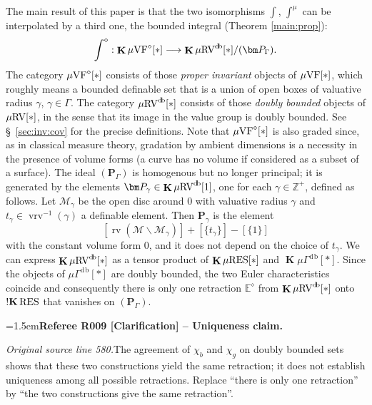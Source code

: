 \documentclass[12pt]{amsart}
\newcommand{\RefereeRemark}[4]{%
  \par\medskip\begingroup\normalfont\small\color{RefereePurple}%
  \emergencystretch=1.5em\noindent\textbf{Referee R#1 [#2] -- #3.}\par\nobreak\noindent #4\par
  \endgroup\medskip
}
\newcommand{\memph}[1]{{\color{magenta}\emph{#1}}}
\theoremstyle{plain}
\theoremstyle{definition}
\theoremstyle{remark}
\numberwithin{equation}{section}
\theoremstyle{plain}
\newcommand{\VF}{\textup{VF}}
\newcommand{\RV}{\textup{RV}}
\newcommand{\MM}{\mdl M}
\newcommand{\Z}{\mathds{Z}}
\newcommand{\0}{\emptyset}
\newcommand{\mdl}[1]{\mathcal{#1}}  %
\newcommand{\bb}[1]{\mathbb{#1}}
\newcommand{\fun}{\longrightarrow}
\newcommand{\mi}{\smallsetminus}
\newcommand{\mgVF}{{\mu} {\VF}}
\newcommand{\mgRV}{{\mu}{\RV}}
\newcommand{\mG}{{\mu}{\Gamma}}
\newcommand{\RES}{\textup{RES}}
\newcommand{\mRES}{{\mu}{\RES}}
\DeclareMathOperator{\rv}{rv}
\DeclareMathOperator{\ggk}{\mathbf{K}}
\DeclareMathOperator{\sggk}{!\mathbf{K}}
\DeclareMathOperator{\vrv}{vrv}
\DeclareMathOperator{\db}{d \! b}
\begin{document}
The main result of this paper is  that the two isomorphisms $\int$, $\int^\mu$ can be interpolated by a third one, the bounded integral (Theorem \ref{main:prop}):
\[
\int^\diamond : \ggk \mgVF^\diamond[*] \fun \ggk  \mgRV^{\db}[*] / (\bm P_\Gamma).
\]
The category $\mgVF^\diamond[*]$ consists of those \memph{proper invariant} objects of $\mgVF[*]$, which roughly means a bounded definable set that is a union of open boxes of valuative radius $\gamma$, $\gamma \in \Gamma$. The category $\mgRV^{\db}[*]$ consists of those \memph{doubly bounded} objects of $\mgRV[*]$, in the sense that its image in the value group is doubly bounded. See \S~\ref{sec:inv:cov} for the precise definitions. Note that $\mgVF^{\diamond}[*]$  is also graded since, as in classical measure theory, gradation by ambient dimensions is a necessity in the presence of volume forms (a curve has no volume if considered as a subset of a surface). The ideal $(\bm P_\Gamma)$ is homogenous but no longer principal; it is generated by the elements $\bm P_\gamma \in \ggk \mgRV^{\db}[1]$, one for each $\gamma \in \Z^+$, defined as follows. Let $\MM_\gamma$ be the open  disc around $0$ with valuative radius $\gamma$ and $t_\gamma \in \vrv^{-1}(\gamma)$ a definable element. Then $\bm P_\gamma$ is the element
\[
[\rv(\MM \mi \MM_{\gamma})] + [\{t_\gamma\}] - [\{1\}]
\]
with the constant volume form $0$, and it does not depend on the choice of $t_\gamma$. We can express $\ggk  \mgRV^{\db}[*]$ as a tensor product of $\ggk \mRES[*]$ and $\ggk \mG^{\db}[*]$. Since the objects of $\mG^{\db}[*]$ are doubly bounded, the two Euler characteristics coincide and consequently there is only one retraction $\bb E^{\diamond}$ from $\ggk  \mgRV^{\db}[*]$ onto $\sggk \RES$ that vanishes on $(\bm P_\Gamma)$.

\RefereeRemark{009}{Clarification}{Uniqueness claim}{%
\textit{Original source line 580.}\quad The agreement of $\chi_b$ and $\chi_g$ on doubly bounded sets shows that these two constructions yield the same retraction; it does not establish uniqueness among all possible retractions. Replace ``there is only one retraction'' by ``the two constructions give the same retraction''. 
}
\end{document}
